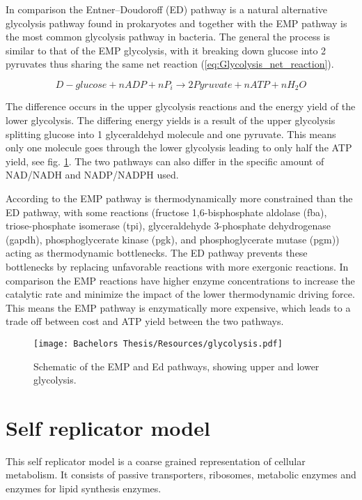 In comparison the Entner–Doudoroff (ED) pathway is a natural alternative glycolysis pathway found in prokaryotes and together with the EMP pathway is the most common glycolysis pathway in bacteria. The general the process is similar to that of the EMP glycolysis, with it breaking down glucose into 2 pyruvates thus sharing the same net reaction (\ref{eq:Glycolysis_net_reaction}).

\begin{equation}
    D-glucose + n ADP + n P_i \rightarrow 2 Pyruvate + n ATP + n H_2O
    \label{eq:Glycolysis_net_reaction}
\end{equation}

The difference occurs in the upper glycolysis reactions and the energy yield of the lower glycolysis. The differing energy yields is a result of the upper glycolysis splitting glucose into 1 glyceraldehyd molecule and one pyruvate. This means only one molecule goes through the lower glycolysis leading to only half the ATP yield, see fig. \ref{fig:glycolysis_scheme}. 
The two pathways can also differ in the specific amount of NAD/NADH and NADP/NADPH used.

According to \cite{flamholz2012glycotic} the EMP pathway is thermodynamically more constrained than the ED pathway, with some reactions (fructose 1,6-bisphosphate aldolase (fba), triose-phosphate isomerase (tpi), glyceraldehyde 3-phosphate dehydrogenase (gapdh), phosphoglycerate kinase (pgk), and phosphoglycerate mutase (pgm)) acting as thermodynamic bottlenecks. The ED pathway prevents these bottlenecks by replacing unfavorable reactions with more exergonic reactions.
In comparison the EMP reactions have higher enzyme concentrations to increase the catalytic rate and minimize the impact of the lower thermodynamic driving force. This means the EMP pathway is enzymatically more expensive, which leads to a trade off between cost and ATP yield between the two pathways. 

\begin{figure}[H]
    \centering
    \texttt{[image: Bachelors Thesis/Resources/glycolysis.pdf]}
    \caption{Schematic of the EMP and Ed pathways, showing upper and lower glycolysis.}
    \label{fig:glycolysis_scheme}
\end{figure}

\section{Self replicator model}
This self replicator model is a coarse grained representation of cellular metabolism. It consists of passive transporters, ribosomes, metabolic enzymes and enzymes for lipid synthesis enzymes. 

